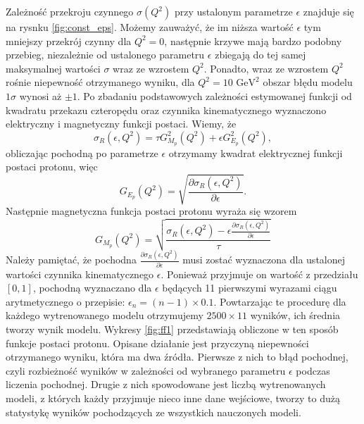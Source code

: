 \documentclass[11pt]{book}
\theoremstyle{definition}
\begin{document}
Zależność przekroju czynnego $\sigma \left(Q^2\right)$ przy ustalonym parametrze $\epsilon$ znajduje się na rysnku \ref{fig:const_eps}. Możemy zauważyć, że im niższa wartość $\epsilon$ tym mniejszy przekrój czynny dla $Q^2=0$, następnie krzywe mają bardzo podobny przebieg, niezależnie od ustalonego parametru $\epsilon$ zbiegają do tej samej maksymalnej wartości $\sigma$ wraz ze wzrostem $Q^2$. Ponadto, wraz ze wzrostem $Q^2$ rośnie niepewność otrzymanego wyniku, dla $Q^2 = 10 \text{ GeV}^2$ obszar błędu modelu $1\sigma$ wynosi aż $\pm 1$.
%
Po zbadaniu podstawowych zależności estymowanej funkcji od kwadratu przekazu czteropędu oraz czynnika kinematycznego wyznaczono elektryczny i magnetyczny funkcji postaci. Wiemy, że  
%
\begin{equation}
\sigma_R(\epsilon, Q^2) =\tau G_{M_p}^2(Q^2) + \epsilon G_{E_p}^2(Q^2),
\end{equation}
%
obliczając pochodną po parametrze $\epsilon$ otrzymamy kwadrat elektrycznej funkcji postaci protonu, więc
%
\begin{equation}
G_{E_p}(Q^2) = \sqrt{\frac{\partial \sigma_R(\epsilon, Q^2)}{\partial \epsilon}}.
\end{equation}
%
Następnie magnetyczna funkcja postaci protonu wyraża się wzorem
%
\begin{equation}
G_{M_p}(Q^2) =   \sqrt{\frac{\sigma_R(\epsilon, Q^2) - \epsilon \frac{\partial \sigma_R(\epsilon, Q^2)}{\partial \epsilon}}{\tau}}
\end{equation}
%
Należy pamiętać, że pochodna $\frac{\partial \sigma_R(\epsilon, Q^2)}{\partial \epsilon}$ musi zostać wyznaczona dla ustalonej wartości czynnika kinematycznego $\epsilon$. Ponieważ przyjmuje on wartość z przedziału $\left[0,1\right]$, pochodną wyznaczano dla $\epsilon$ będących 11 pierwszymi wyrazami ciągu arytmetycznego o przepisie: $\epsilon_n = (n-1) \times 0.1$. Powtarzając te procedurę dla każdego wytrenowanego modelu otrzymujemy $2500 \times 11$ wyników, ich średnia tworzy wynik modelu. Wykresy \ref{fig:ff1} przedstawiają obliczone w ten sposób funkcje postaci protonu. Opisane działanie jest przyczyną niepewności otrzymanego wyniku, która ma dwa źródła. Pierwsze z nich to błąd pochodnej, czyli rozbieżność wyników w zależności od wybranego parametru $\epsilon$ podczas liczenia pochodnej. Drugie z nich spowodowane jest liczbą wytrenowanych modeli, z których każdy przyjmuje nieco inne dane wejściowe, tworzy to dużą statystykę wyników pochodzących ze wszystkich nauczonych modeli.
%
\end{document}
